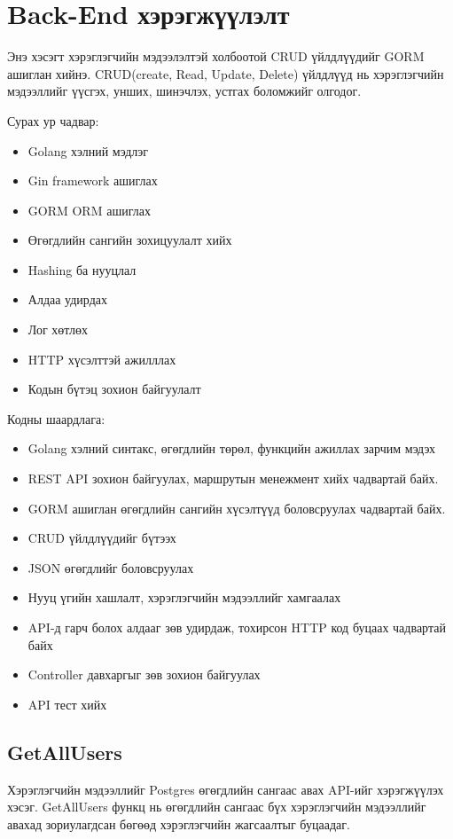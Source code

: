 \section{Back-End хэрэгжүүлэлт}
Энэ хэсэгт хэрэглэгчийн мэдээлэлтэй холбоотой CRUD үйлдлүүдийг GORM ашиглан хийнэ.
CRUD(create, Read, Update, Delete) үйлдлүүд нь хэрэглэгчийн мэдээллийг үүсгэх, унших,
шинэчлэх, устгах боломжийг олгодог.

Сурах ур чадвар:
\begin{itemize}
	\item Golang хэлний мэдлэг
	\item Gin framework ашиглах
	\item GORM ORM ашиглах
	\item Өгөгдлийн сангийн зохицуулалт хийх
	\item Hashing ба нууцлал
	\item Алдаа удирдах
	\item Лог хөтлөх
	\item HTTP хүсэлттэй ажилллах
	\item Кодын бүтэц зохион байгуулалт
\end{itemize}

Кодны шаардлага:
\begin{itemize}
	\item Golang хэлний синтакс, өгөгдлийн төрөл, функцийн ажиллах зарчим мэдэх 
	\item REST API зохион байгуулах, маршрутын менежмент хийх чадвартай байх.
	\item GORM ашиглан өгөгдлийн сангийн хүсэлтүүд боловсруулах чадвартай байх.
	\item CRUD үйлдлүүдийг бүтээх
	\item JSON өгөгдлийг боловсруулах
	\item Нууц үгийн хашлалт, хэрэглэгчийн мэдээллийг хамгаалах
	\item API-д гарч болох алдааг зөв удирдаж, тохирсон HTTP код буцаах чадвартай байх
	\item Controller  давхаргыг зөв зохион байгуулах
	\item API тест хийх
\end{itemize}
\pagebreak

\subsection{GetAllUsers}
Хэрэглэгчийн мэдээллийг Postgres өгөгдлийн сангаас авах API-ийг хэрэгжүүлэх хэсэг. GetAllUsers функц нь өгөгдлийн сангаас бүх хэрэглэгчийн мэдээллийг авахад зориулагдсан бөгөөд хэрэглэгчийн жагсаалтыг буцаадаг.

